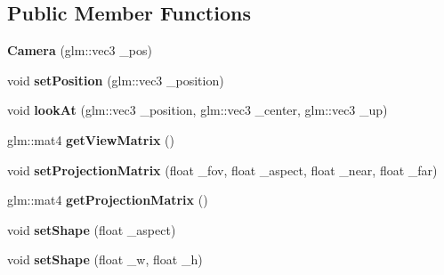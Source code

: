 \subsection*{Public Member Functions}
\begin{DoxyCompactItemize}
\item 
\hypertarget{class_camera_a583c769d57c096097a4cd55b0508acb9}{{\bfseries Camera} (glm\-::vec3 \-\_\-pos)}\label{class_camera_a583c769d57c096097a4cd55b0508acb9}

\item 
\hypertarget{class_camera_a4cfdd84e228c1353ee42ddd67059119b}{void {\bfseries set\-Position} (glm\-::vec3 \-\_\-position)}\label{class_camera_a4cfdd84e228c1353ee42ddd67059119b}

\item 
\hypertarget{class_camera_a0b021889f36bc9ba71eb55eef4d81651}{void {\bfseries look\-At} (glm\-::vec3 \-\_\-position, glm\-::vec3 \-\_\-center, glm\-::vec3 \-\_\-up)}\label{class_camera_a0b021889f36bc9ba71eb55eef4d81651}

\item 
\hypertarget{class_camera_a5569ca5967e01d3344fbf6aba36d9820}{glm\-::mat4 {\bfseries get\-View\-Matrix} ()}\label{class_camera_a5569ca5967e01d3344fbf6aba36d9820}

\item 
\hypertarget{class_camera_a2cb6fc559062f2c3aea4856d8838adf9}{void {\bfseries set\-Projection\-Matrix} (float \-\_\-fov, float \-\_\-aspect, float \-\_\-near, float \-\_\-far)}\label{class_camera_a2cb6fc559062f2c3aea4856d8838adf9}

\item 
\hypertarget{class_camera_adf09522521723786b9f405c99d6594c7}{glm\-::mat4 {\bfseries get\-Projection\-Matrix} ()}\label{class_camera_adf09522521723786b9f405c99d6594c7}

\item 
\hypertarget{class_camera_a019c5a2e4e223af12e8c1b6c48cd825b}{void {\bfseries set\-Shape} (float \-\_\-aspect)}\label{class_camera_a019c5a2e4e223af12e8c1b6c48cd825b}

\item 
\hypertarget{class_camera_ad279e684b491faecf277fb780e4b370f}{void {\bfseries set\-Shape} (float \-\_\-w, float \-\_\-h)}\label{class_camera_ad279e684b491faecf277fb780e4b370f}

\end{DoxyCompactItemize}

